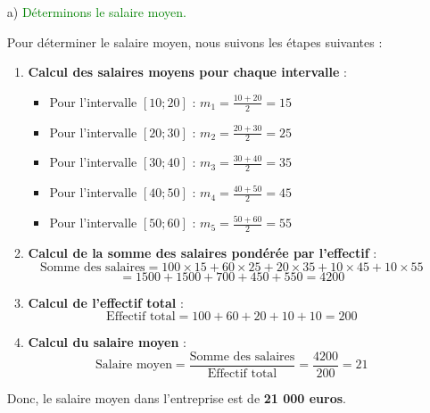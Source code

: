 \documentclass[12pt]{article}
\begin{document}
\begin{enumerate}
  \item[a)] \textcolor{green}{Déterminons le salaire moyen.}

  Pour déterminer le salaire moyen, nous suivons les étapes suivantes :

  \begin{enumerate}
    \item \textbf{Calcul des salaires moyens pour chaque intervalle} :
    \begin{itemize}
      \item Pour l'intervalle \([10;20]\) : \(m_1 = \frac{10 + 20}{2} = 15\)
      \item Pour l'intervalle \([20;30]\) : \(m_2 = \frac{20 + 30}{2} = 25\)
      \item Pour l'intervalle \([30;40]\) : \(m_3 = \frac{30 + 40}{2} = 35\)
      \item Pour l'intervalle \([40;50]\) : \(m_4 = \frac{40 + 50}{2} = 45\)
      \item Pour l'intervalle \([50;60]\) : \(m_5 = \frac{50 + 60}{2} = 55\)
    \end{itemize}

    \item \textbf{Calcul de la somme des salaires pondérée par l'effectif} :
    \[
    \text{Somme des salaires} = 100 \times 15 + 60 \times 25 + 20 \times 35 + 10 \times 45 + 10 \times 55
    \]
    \[
    = 1500 + 1500 + 700 + 450 + 550 = 4200
    \]

    \item \textbf{Calcul de l'effectif total} :
    \[
    \text{Effectif total} = 100 + 60 + 20 + 10 + 10 = 200
    \]

    \item \textbf{Calcul du salaire moyen} :
    \[
    \text{Salaire moyen} = \frac{\text{Somme des salaires}}{\text{Effectif total}} = \frac{4200}{200} = 21
    \]
  \end{enumerate}

  Donc, le salaire moyen dans l'entreprise est de \textbf{21 000 euros}.
  
\end{enumerate}
\end{document}
